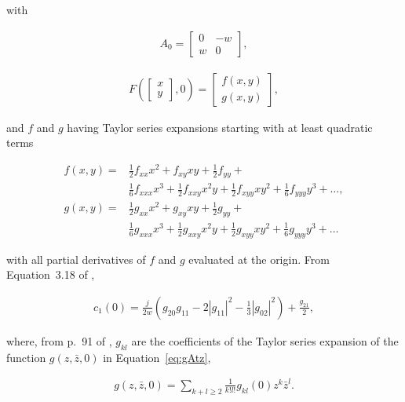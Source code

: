 \documentclass{article}
\theoremstyle{lemma}
\begin{document}
\noindent with 

\begin{align}
 A_0=\left[\begin{array}{cc}
            0 & -w\\
            w & 0
           \end{array}\right],
\label{eq:a0}
\end{align}

\begin{align}
F\left(\left[\begin{array}{c}
              x\\
              y
             \end{array}\right],0\right)=\left[\begin{array}{c}
                                                f(x,y)\\
                                                g(x,y)
                                               \end{array}\right],
\label{eq:F}
\end{align}

\noindent and $f$ and $g$ having Taylor series expansions starting with at
least quadratic terms

\begin{align}
f(x,y)=&\frac{1}{2}f_{xx}x^2+f_{xy}xy+\frac{1}{2}f_{yy}+\nonumber\\
&\frac{1}{6}f_{xxx}x^3+\frac{1}{2}f_{xxy}x^2y+\frac{1}{2}f_{xyy}xy^2+\frac{1}{6}f_{yyy}y^3+\ldots,\label{eq:fTaylor}\\
g(x,y)=&\frac{1}{2}g_{xx}x^2+g_{xy}xy+\frac{1}{2}g_{yy}+\nonumber\\
&\frac{1}{6}g_{xxx}x^3+\frac{1}{2}g_{xxy}x^2y+\frac{1}{2}g_{xyy}xy^2+\frac{1}{6}g_{yyy}y^3+\ldots\label{eq:gTaylor}
\end{align}

\noindent with all partial derivatives of $f$ and $g$ evaluated at the origin.
From Equation~3.18 of \citet{kuznetsov04},

\begin{align}
c_1(0)=\frac{j}{2w}\left(g_{20}g_{11}-2|g_{11}|^2-\frac{1}{3}|g_{02}|^2\right)+\frac{g_{21}}{2},
\label{eq:c1(0)}
\end{align}

\noindent where, from p.~91 of \citet{kuznetsov04}, $g_{kl}$ are the
coefficients of the Taylor series expansion of the function $g(z,\bar{z},0)$
in Equation~\ref{eq:gAtz},

\begin{align}
g(z,\bar{z},0)=\sum_{k+l\ge2}\frac{1}{k!l!}g_{kl}(0)z^k\bar{z}^l.
\end{align}
\end{document}
